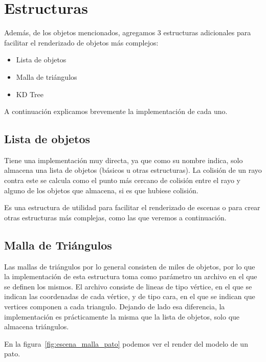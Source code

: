 \section{Estructuras} \label{sec:estructuras}

Además, de los objetos mencionados, agregamos 3 estructuras adicionales para facilitar el
renderizado de objetos más complejos:

\begin{itemize}
    \item Lista de objetos
    \item Malla de triángulos
    \item KD Tree
\end{itemize}

A continuación explicamos brevemente la implementación de cada uno.
\subsection{Lista de objetos} \label{subsec:lista_objetos}

Tiene una implementación muy directa, ya que como su nombre indica, solo almacena una lista
de objetos (básicos u otras estructuras).
La colisión de un rayo contra este se calcula como el punto más cercano de colisión entre el rayo y
alguno de los objetos que almacena, si es que hubiese colisión.

Es una estructura de utilidad para facilitar el renderizado de escenas o para crear otras
estructuras más complejas, como las que veremos a continuación.

\subsection{Malla de Triángulos} \label{subsec:malla_triangulos}

Las mallas de triángulos por lo general consisten de miles de objetos, por lo que la
implementación de esta estructura toma como parámetro un archivo en el que se definen los mismos.
El archivo consiste de lineas de tipo vértice, en el que se indican las coordenadas de cada
vértice, y de tipo cara, en el que se indican que vertices componen a cada triangulo.
Dejando de lado esa diferencia, la implementación es prácticamente la misma que la lista de objetos,
solo que almacena triángulos.

En la figura~\ref{fig:escena_malla_pato} podemos ver el render del modelo de un pato.

